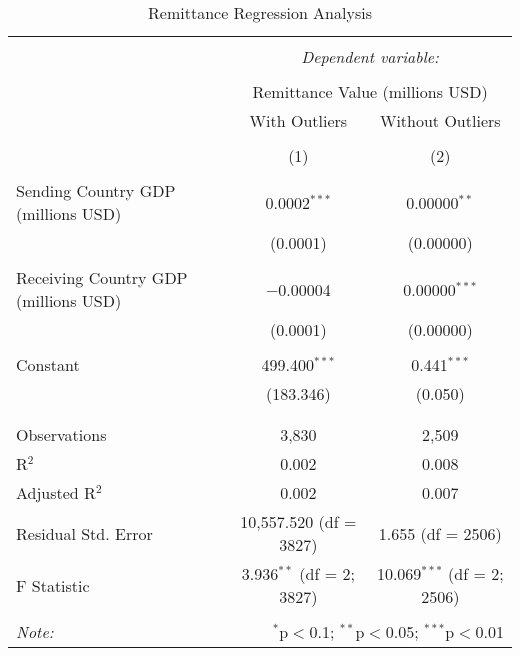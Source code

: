 
\begin{table}[!htbp] \centering 
  \caption{Remittance Regression Analysis} 
  \label{} 
\begin{tabular}{@{\extracolsep{5pt}}lcc} 
\\[-1.8ex]\hline 
\hline \\[-1.8ex] 
 & \multicolumn{2}{c}{\textit{Dependent variable:}} \\ 
\cline{2-3} 
\\[-1.8ex] & \multicolumn{2}{c}{Remittance Value (millions USD)} \\ 
 & With Outliers & Without Outliers \\ 
\\[-1.8ex] & (1) & (2)\\ 
\hline \\[-1.8ex] 
 Sending Country GDP (millions USD) & 0.0002$^{***}$ & 0.00000$^{**}$ \\ 
  & (0.0001) & (0.00000) \\ 
  & & \\ 
 Receiving Country GDP (millions USD) & $-$0.00004 & 0.00000$^{***}$ \\ 
  & (0.0001) & (0.00000) \\ 
  & & \\ 
 Constant & 499.400$^{***}$ & 0.441$^{***}$ \\ 
  & (183.346) & (0.050) \\ 
  & & \\ 
\hline \\[-1.8ex] 
Observations & 3,830 & 2,509 \\ 
R$^{2}$ & 0.002 & 0.008 \\ 
Adjusted R$^{2}$ & 0.002 & 0.007 \\ 
Residual Std. Error & 10,557.520 (df = 3827) & 1.655 (df = 2506) \\ 
F Statistic & 3.936$^{**}$ (df = 2; 3827) & 10.069$^{***}$ (df = 2; 2506) \\ 
\hline 
\hline \\[-1.8ex] 
\textit{Note:}  & \multicolumn{2}{r}{$^{*}$p$<$0.1; $^{**}$p$<$0.05; $^{***}$p$<$0.01} \\ 
\end{tabular} 
\end{table} 
